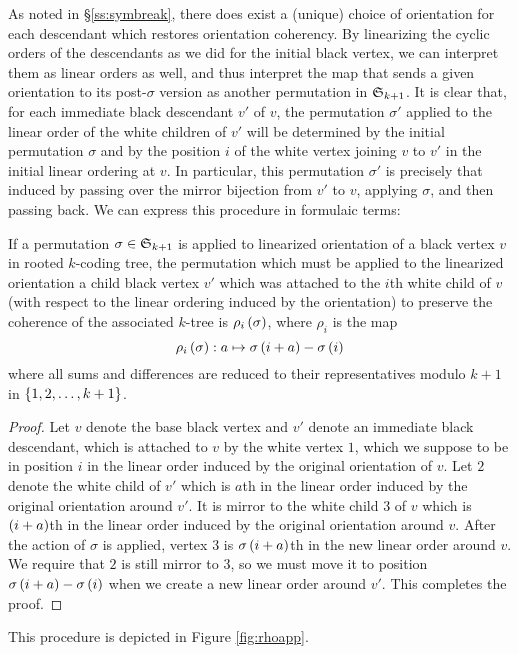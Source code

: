 \documentclass[sectionflow,singlespace,twoside,boldmathhdr,draft]{brandiss} %
\numberwithin{section}{chapter}
\numberwithin{figure}{chapter}
\begin{document}
As noted in \S \ref{ss:symbreak}, there does exist a (unique) choice of orientation for each descendant which restores orientation coherency.
By linearizing the cyclic orders of the descendants as we did for the initial black vertex, we can interpret them as linear orders as well, and thus interpret the map that sends a given orientation to its post-$\sigma$ version as another permutation in $ \mathfrak{S}_{k+1} $.
It is clear that, for each immediate black descendant $v'$ of $v$, the permutation $\sigma'$ applied to the linear order of the white children of $v'$ will be determined by the initial permutation $\sigma$ and by the position $i$ of the white vertex joining $v$ to $v'$ in the initial linear ordering at $v$.
In particular, this permutation $\sigma'$ is precisely that induced by passing over the mirror bijection from $v'$ to $v$, applying $\sigma$, and then passing back.
We can express this procedure in formulaic terms:
\begin{theorem}
  \label{thm:rhodef}
  If a permutation $\sigma \in  \mathfrak{S}_{k+1} $ is applied to linearized orientation of a black vertex $v$ in rooted $k$-coding tree, the permutation which must be applied to the linearized orientation a child black vertex $v'$ which was attached to the $i$th white child of $v$ (with respect to the linear ordering induced by the orientation) to preserve the coherence of the associated $k$-tree is $\rho_{i} \left( {\sigma} \right)$, where $\rho_{i}$ is the map
  \begin{equation}
    \label{eq:rhodef}
    \rho_{i} \left( {\sigma} \right): a \mapsto \sigma \left( {i + a} \right) - \sigma \left( {i} \right)
  \end{equation}
  where all sums and differences are reduced to their representatives modulo $k+1$ in $\left\{ {1, 2, \dots, k+1} \right\}$.
\end{theorem}
\begin{proof}
  Let $v$ denote the base black vertex and $v'$ denote an immediate black descendant, which is attached to $v$ by the white vertex $1$, which we suppose to be in position $i$ in the linear order induced by the original orientation of $v$.
  Let $2$ denote the white child of $v'$ which is $a$th in the linear order induced by the original orientation around $v'$.
  It is mirror to the white child $3$ of $v$ which is $\left( {i+a} \right)$th in the linear order induced by the original orientation around $v$.
  After the action of $\sigma$ is applied, vertex $3$ is $\sigma \left( {i+a} \right)$th in the new linear order around $v$.
  We require that $2$ is still mirror to $3$, so we must move it to position $\sigma \left( {i + a} \right) - \sigma \left( {i} \right)$ when we create a new linear order around $v'$.
  This completes the proof.
\end{proof}
This procedure is depicted in Figure \ref{fig:rhoapp}.
\end{document}
